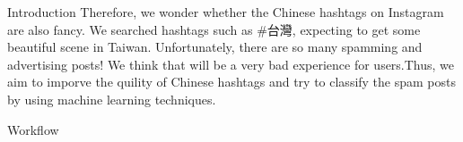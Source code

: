 \documentclass[final,hyperref={pdfpagelabels=false}]{beamer}
\begin{document}
\begin{frame}[t]
\begin{columns}[t]
\begin{column}{.465\textwidth}
\begin{block}{Introduction}
\quad Therefore, we wonder whether the Chinese hashtags on Instagram are also fancy. We searched hashtags such as \#台灣,  expecting to get some beautiful scene in Taiwan. Unfortunately, there are so many spamming and advertising posts! We think that will be a very bad experience for users.Thus, we aim to imporve the quility of Chinese hashtags and try to classify the spam posts by using machine learning techniques.

\begin{figure}
\centering
{}
\hspace{1em}
\end{figure}


\end{block}


\begin{block}{Workflow}



\end{block}
\end{column}
\end{columns}
\end{frame}
\end{document}
